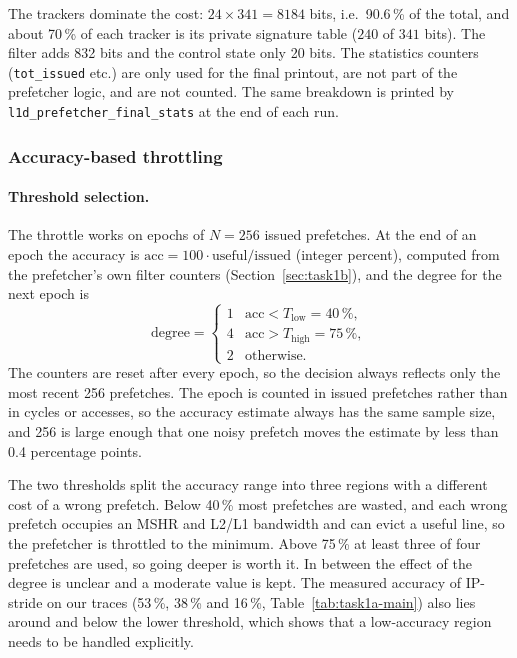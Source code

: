 \documentclass[11pt,a4paper]{article}
\begin{document}
The trackers dominate the cost: $24 \times 341 = 8184$ bits, i.e.\ 90.6\,\% of the total, and
about 70\,\% of each tracker is its private signature table ($240$ of $341$ bits). The filter adds 832
bits and the control state only 20 bits. The statistics counters (\texttt{tot\_issued} etc.) are
only used for the final printout, are not part of the prefetcher logic, and are not counted. The
same breakdown is printed by \texttt{l1d\_prefetcher\_final\_stats} at the end of each run.

\subsubsection{Accuracy-based throttling}
\label{sec:throttling}
\paragraph{Threshold selection.}
The throttle works on epochs of $N=256$ issued prefetches. At the end of an epoch the accuracy is
$\text{acc} = 100\cdot\text{useful}/\text{issued}$ (integer percent), computed from the prefetcher's own
filter counters (Section~\ref{sec:task1b}), and the degree for the next epoch is
\[
\text{degree} =
\begin{cases}
1 & \text{acc} < T_{\text{low}} = 40\,\%,\\
4 & \text{acc} > T_{\text{high}} = 75\,\%,\\
2 & \text{otherwise.}
\end{cases}
\]
The counters are reset after every epoch, so the decision always reflects only the most recent 256
prefetches. The epoch is counted in issued prefetches rather than in cycles or accesses, so the
accuracy estimate always has the same sample size, and 256 is large enough that one noisy
prefetch moves the estimate by less than 0.4 percentage points.

The two thresholds split the accuracy range into three regions with a different cost of a wrong
prefetch. Below 40\,\% most prefetches are wasted, and each
wrong prefetch occupies an MSHR and L2/L1 bandwidth and can evict a useful line, so the prefetcher
is throttled to the minimum. Above 75\,\% at least three of four prefetches are used, so going
deeper is worth it. In between the effect of the degree is unclear and a moderate value is kept.
The measured accuracy of IP-stride on our traces (53\,\%, 38\,\% and 16\,\%, Table~\ref{tab:task1a-main})
also lies around and below the lower threshold, which shows that a low-accuracy region needs to be
handled explicitly.
\end{document}
